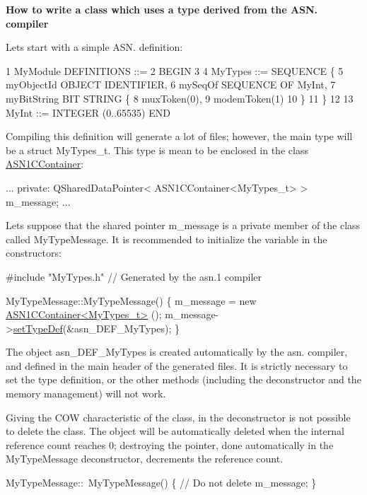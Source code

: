 {\bfseries  How to write a class which uses a type derived from the A\+S\+N. compiler }

Let\textquotesingle{}s start with a simple A\+S\+N. definition\+:


\begin{DoxyCode}
1 MyModule DEFINITIONS ::=
2 BEGIN
3 
4 MyTypes ::= SEQUENCE \{
5   myObjectId OBJECT IDENTIFIER,
6   mySeqOf SEQUENCE OF MyInt,
7   myBitString BIT STRING \{
8                     muxToken(0),
9                     modemToken(1)
10               \}
11 \}
12 
13 MyInt ::= INTEGER (0..65535) END
\end{DoxyCode}


Compiling this definition will generate a lot of files; however, the main type will be a struct My\+Types\+\_\+t. This type is mean to be enclosed in the class \hyperlink{classASN1CContainer}{A\+S\+N1\+C\+Container}\+: 
\begin{DoxyCode}
...
private:
    QSharedDataPointer< ASN1CContainer<MyTypes\_t> > m\_message;
...
\end{DoxyCode}


Let\textquotesingle{}s suppose that the shared pointer m\+\_\+message is a private member of the class called My\+Type\+Message. It is recommended to initialize the variable in the constructors\+: 
\begin{DoxyCode}
\textcolor{preprocessor}{#include "MyTypes.h"} \textcolor{comment}{// Generated by the asn.1 compiler}

MyTypeMessage::MyTypeMessage()
\{
    m\_message = \textcolor{keyword}{new} \hyperlink{classASN1CContainer}{ASN1CContainer<MyTypes\_t>} ();
    m\_message->\hyperlink{classASN1CContainer_a61559655caab168362a30c0538950ba3}{setTypeDef}(&asn\_DEF\_MyTypes);
\}
\end{DoxyCode}
 The object asn\+\_\+\+D\+E\+F\+\_\+\+My\+Types is created automatically by the asn. compiler, and defined in the main header of the generated files. It is strictly necessary to set the type definition, or the other methods (including the deconstructor and the memory management) will not work.

Giving the C\+OW characteristic of the class, in the deconstructor is not possible to delete the class. The object will be automatically deleted when the internal reference count reaches 0; destroying the pointer, done automatically in the My\+Type\+Message deconstructor, decrements the reference count. 
\begin{DoxyCode}
MyTypeMessage::~MyTypeMessage()
\{
    \textcolor{comment}{// Do not delete m\_message;}
\}
\end{DoxyCode}


